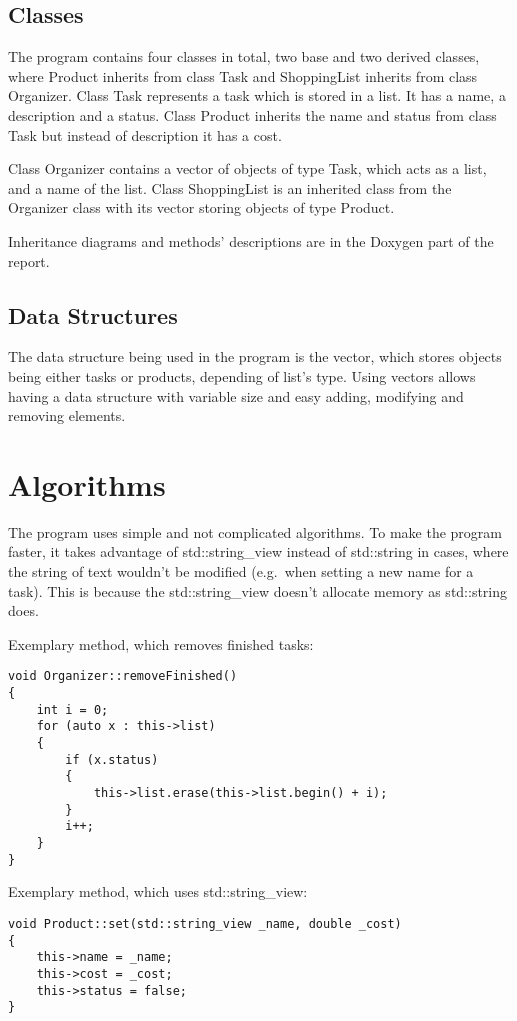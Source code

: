 \documentclass{article}
\begin{document}
\subsection{Classes}

The program contains four classes in total, two base and two derived classes, where Product inherits from class Task and ShoppingList inherits from class Organizer. 
Class Task represents a task which is stored in a list. It has a name, a description and a status. Class Product inherits the name and status from class Task but instead of description it has a cost.

Class Organizer contains a vector of objects of type Task, which acts as a list, and a name of the list. Class ShoppingList is an inherited class from the Organizer class with its vector storing objects of type Product.

Inheritance diagrams and methods' descriptions are in the Doxygen part of the report.

\subsection{Data Structures}

The data structure being used in the program is the vector, which stores objects being either tasks or products, depending of list's type. Using vectors allows having a data structure with variable size and easy adding, modifying and removing elements.  

\pagebreak

\section{Algorithms}

The program uses simple and not complicated algorithms. To make the program faster, it takes advantage of std::string\_view instead of std::string in cases, where the string of text wouldn't be modified (e.g.\ when setting a new name for a task). This is because the std::string\_view doesn't allocate memory as std::string does.

Exemplary method, which removes finished tasks:
\begin{lstlisting}
void Organizer::removeFinished()
{
    int i = 0;
    for (auto x : this->list)   
    {
        if (x.status)   
        {
            this->list.erase(this->list.begin() + i);
        }
        i++;
    }
}
\end{lstlisting}
Exemplary method, which uses std::string\_view:
\begin{lstlisting}
void Product::set(std::string_view _name, double _cost)
{
    this->name = _name;
    this->cost = _cost;
    this->status = false;
}
\end{lstlisting}
\end{document}
